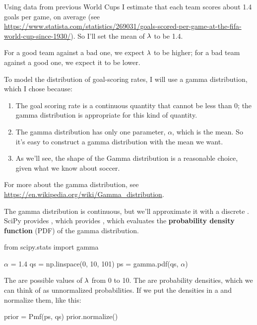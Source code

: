 \documentclass[12pt]{book}
\theoremstyle{exercise}
\begin{document}
Using data from previous World Cups 
I estimate that each team scores about 1.4 goals per game, on average (see \url{https://www.statista.com/statistics/269031/goals-scored-per-game-at-the-fifa-world-cup-since-1930/}).  So I'll set the mean of $\mathtt{\lambda}$ to be 1.4.

For a good team against a bad one, we expect $\mathtt{\lambda}$ to be higher; for a bad team against a good one, we expect it to be lower.

To model the distribution of goal-scoring rates, I will use a gamma distribution, which I chose because:

\begin{enumerate}

\item The goal scoring rate is a continuous quantity that cannot be less than 0; the gamma distribution is appropriate for this kind of quantity.

\item The gamma distribution has only one parameter, $\alpha$, which is the mean.  So it's easy to construct a gamma distribution with the mean we want.

\item As we'll see, the shape of the Gamma distribution is a reasonable choice, given what we know about soccer.

\end{enumerate}

For more about the gamma distribution, see \url{https://en.wikipedia.org/wiki/Gamma_distribution}.

The gamma distribution is continuous, but we'll approximate it with a discrete .
SciPy provides , which provides , which evaluates the {\bf probability density function} (PDF) of the gamma distribution.

\newcommand{\alf}{\mathtt{\alpha}}

\begin{code}
from scipy.stats import gamma

$\alf$ = 1.4
qs = np.linspace(0, 10, 101)
ps = gamma.pdf(qs, $\alf$)
\end{code}

The  are possible values of $\mathtt{\lambda}$ from 0 to 10.
The  are probability densities, which we can think of as unnormalized probabilities.
If we put the densities in a  and normalize them, like this:

\begin{code}
prior = Pmf(ps, qs)
prior.normalize()
\end{code}
\end{document}
